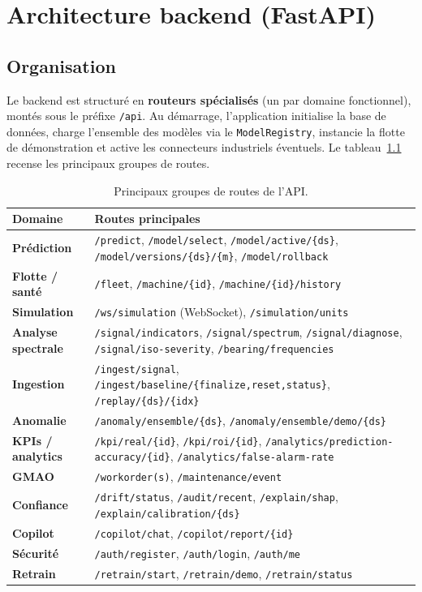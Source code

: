\chapter{Architecture backend (FastAPI)}
\label{chap:backend}

\section{Organisation}
Le backend est structuré en \textbf{routeurs spécialisés} (un par domaine fonctionnel),
montés sous le préfixe \texttt{/api}. Au démarrage, l'application initialise la base de
données, charge l'ensemble des modèles via le \texttt{ModelRegistry}, instancie la flotte
de démonstration et active les connecteurs industriels éventuels. Le
tableau~\ref{tab:routes} recense les principaux groupes de routes.

\begin{table}[h]
\centering\small
\caption{Principaux groupes de routes de l'API.}
\label{tab:routes}
\begin{tabular}{>{\bfseries}l p{9.5cm}}
\toprule
Domaine & Routes principales \\
\midrule
Prédiction & \texttt{/predict}, \texttt{/model/select}, \texttt{/model/active/\{ds\}},
             \texttt{/model/versions/\{ds\}/\{m\}}, \texttt{/model/rollback} \\
Flotte / santé & \texttt{/fleet}, \texttt{/machine/\{id\}}, \texttt{/machine/\{id\}/history} \\
Simulation & \texttt{/ws/simulation} (WebSocket), \texttt{/simulation/units} \\
Analyse spectrale & \texttt{/signal/indicators}, \texttt{/signal/spectrum},
             \texttt{/signal/diagnose}, \texttt{/signal/iso-severity}, \texttt{/bearing/frequencies} \\
Ingestion & \texttt{/ingest/signal}, \texttt{/ingest/baseline/\{finalize,reset,status\}}, \texttt{/replay/\{ds\}/\{idx\}} \\
Anomalie & \texttt{/anomaly/ensemble/\{ds\}}, \texttt{/anomaly/ensemble/demo/\{ds\}} \\
KPIs / analytics & \texttt{/kpi/real/\{id\}}, \texttt{/kpi/roi/\{id\}},
             \texttt{/analytics/prediction-accuracy/\{id\}}, \texttt{/analytics/false-alarm-rate} \\
GMAO & \texttt{/workorder(s)}, \texttt{/maintenance/event} \\
Confiance & \texttt{/drift/status}, \texttt{/audit/recent}, \texttt{/explain/shap},
             \texttt{/explain/calibration/\{ds\}} \\
Copilot & \texttt{/copilot/chat}, \texttt{/copilot/report/\{id\}} \\
Sécurité & \texttt{/auth/register}, \texttt{/auth/login}, \texttt{/auth/me} \\
Retrain & \texttt{/retrain/start}, \texttt{/retrain/demo}, \texttt{/retrain/status} \\
\bottomrule
\end{tabular}
\end{table}

